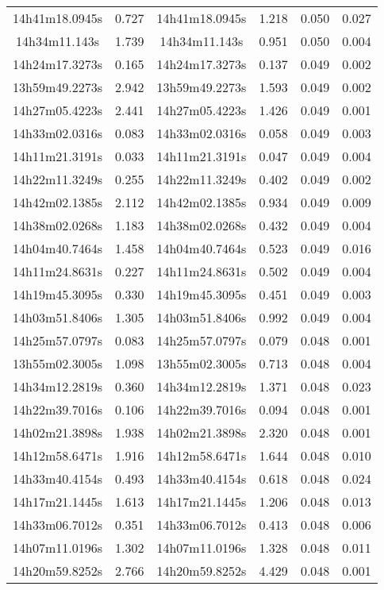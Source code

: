 \begin{table}
\begin{tabular}{cccccc}
14h41m18.0945s & 0.727 & 14h41m18.0945s & 1.218 & 0.050 & 0.027 \\
14h34m11.143s & 1.739 & 14h34m11.143s & 0.951 & 0.050 & 0.004 \\
14h24m17.3273s & 0.165 & 14h24m17.3273s & 0.137 & 0.049 & 0.002 \\
13h59m49.2273s & 2.942 & 13h59m49.2273s & 1.593 & 0.049 & 0.002 \\
14h27m05.4223s & 2.441 & 14h27m05.4223s & 1.426 & 0.049 & 0.001 \\
14h33m02.0316s & 0.083 & 14h33m02.0316s & 0.058 & 0.049 & 0.003 \\
14h11m21.3191s & 0.033 & 14h11m21.3191s & 0.047 & 0.049 & 0.004 \\
14h22m11.3249s & 0.255 & 14h22m11.3249s & 0.402 & 0.049 & 0.002 \\
14h42m02.1385s & 2.112 & 14h42m02.1385s & 0.934 & 0.049 & 0.009 \\
14h38m02.0268s & 1.183 & 14h38m02.0268s & 0.432 & 0.049 & 0.004 \\
14h04m40.7464s & 1.458 & 14h04m40.7464s & 0.523 & 0.049 & 0.016 \\
14h11m24.8631s & 0.227 & 14h11m24.8631s & 0.502 & 0.049 & 0.004 \\
14h19m45.3095s & 0.330 & 14h19m45.3095s & 0.451 & 0.049 & 0.003 \\
14h03m51.8406s & 1.305 & 14h03m51.8406s & 0.992 & 0.049 & 0.004 \\
14h25m57.0797s & 0.083 & 14h25m57.0797s & 0.079 & 0.048 & 0.001 \\
13h55m02.3005s & 1.098 & 13h55m02.3005s & 0.713 & 0.048 & 0.004 \\
14h34m12.2819s & 0.360 & 14h34m12.2819s & 1.371 & 0.048 & 0.023 \\
14h22m39.7016s & 0.106 & 14h22m39.7016s & 0.094 & 0.048 & 0.001 \\
14h02m21.3898s & 1.938 & 14h02m21.3898s & 2.320 & 0.048 & 0.001 \\
14h12m58.6471s & 1.916 & 14h12m58.6471s & 1.644 & 0.048 & 0.010 \\
14h33m40.4154s & 0.493 & 14h33m40.4154s & 0.618 & 0.048 & 0.024 \\
14h17m21.1445s & 1.613 & 14h17m21.1445s & 1.206 & 0.048 & 0.013 \\
14h33m06.7012s & 0.351 & 14h33m06.7012s & 0.413 & 0.048 & 0.006 \\
14h07m11.0196s & 1.302 & 14h07m11.0196s & 1.328 & 0.048 & 0.011 \\
14h20m59.8252s & 2.766 & 14h20m59.8252s & 4.429 & 0.048 & 0.001 \\

\end{tabular}
\end{table}

